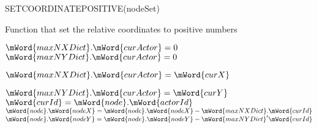 SETCOORDINATEPOSITIVE(nodeSet)
\begin{algorithm}
  \caption{Function that set the relative coordinates to positive numbers}
  \begin{algorithmic}[1]
  \Statex
                    \State $\mWord{maxNXDict}.\mWord{curActor} = 0$
                \EndIf
                    \State $\mWord{maxNYDict}.\mWord{curActor} = 0$
                \EndIf

                    	\State $\mWord{maxNXDict}.\mWord{curActor} = \mWord{curX}$
                    \EndIf
                \EndIf

                    	\State $\mWord{maxNYDict}.\mWord{curActor} = \mWord{curY}$
                    \EndIf
                \EndIf
  \EndFor
  	\State $\mWord{curId} = \mWord{node}.\mWord{actorId}$
  	\State $\mWord{node}.\mWord{nodeX} = \mWord{node}.\mWord{nodeX} - \mWord{maxNXDict}.\mWord{curId}$
	\State $\mWord{node}.\mWord{nodeY} = \mWord{node}.\mWord{nodeY} - \mWord{maxNYDict}'\mWord{curId}$
  \EndFor
  \EndFunction
  \end{algorithmic}
\end{algorithm}


